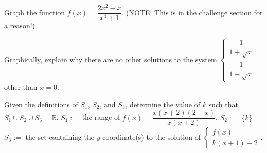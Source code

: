 \documentclass[../book.tex]{subfiles}
\begin{document}
\begin{challengeset}
\item Graph the function $f(x)=\dfrac{2x^2-x}{x^4+1}$. (NOTE: This is in the challenge section for a reason!) \vspace{3mm}
\item Graphically, explain why there are no other solutions to the system $\begin{cases} \dfrac{1}{1+\sqrt{x}} \\ \dfrac{1}{1-\sqrt{x}} \end{cases}$ other than $x=0$.
\item Given the definitions of $S_1$, $S_2$, and $S_3$, determine the value of $k$ such that $S_1\cup S_2\cup S_3=\mathbb{R}$. \newline 
$S_1:=$ the range of $f(x)=\dfrac{x(x+2)(2-x)}{x(x+2)}$. \newline 
$S_2:=$ $\{k\}$ \newline 
$S_3:=$ the set containing the $y$-coordinate(s) to the solution of $\begin{cases} f(x) \\ k(x+1)-2\end{cases}$. \vspace{3mm}
\end{challengeset}
\end{document}
